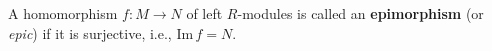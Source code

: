 A homomorphism $f: M \to N$ of left $R$-modules is called an \textbf{epimorphism} (or \textit{epic}) if it is surjective, i.e., $\text{Im}\, f = N$.
